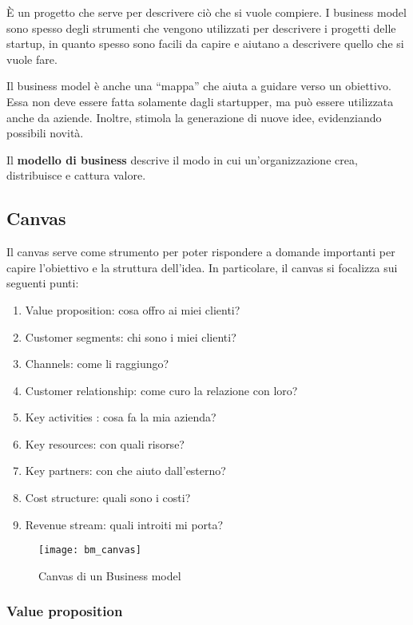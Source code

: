 È un progetto che serve per descrivere ciò che si vuole compiere. I business
model sono spesso degli strumenti che vengono utilizzati per descrivere i
progetti delle startup, in quanto spesso sono facili da capire e aiutano a
descrivere quello che si vuole fare.

Il business model è anche una ``mappa'' che aiuta a guidare verso un obiettivo.
Essa non deve essere fatta solamente dagli startupper, ma può essere utilizzata
anche da aziende. Inoltre, stimola la generazione di nuove idee, evidenziando
possibili novità.

\begin{definition}
Il \textbf{modello di business} descrive il modo in cui un'organizzazione crea,
distribuisce e cattura valore.
\end{definition}

\subsection{Canvas}

Il canvas serve come strumento per poter rispondere a domande importanti per
capire l'obiettivo e la struttura dell'idea. In particolare, il
canvas si focalizza sui seguenti punti:
\begin{enumerate}
 \item Value proposition: cosa offro ai miei clienti?
 \item Customer segments: chi sono i miei clienti?
 \item Channels: come li raggiungo?
 \item Customer relationship: come curo la relazione con loro?
 \item Key activities : cosa fa la mia azienda?
 \item Key resources: con quali risorse?
 \item Key partners: con che aiuto dall'esterno?
 \item Cost structure: quali sono i costi?
 \item Revenue stream: quali introiti mi porta?
\end{enumerate}

\begin{figure}[t]
 \centering
 \texttt{[image: bm\_canvas]}
 \caption{Canvas di un Business model}
 \label{fig:bm:bm}
\end{figure}


\subsubsection{Value proposition}

